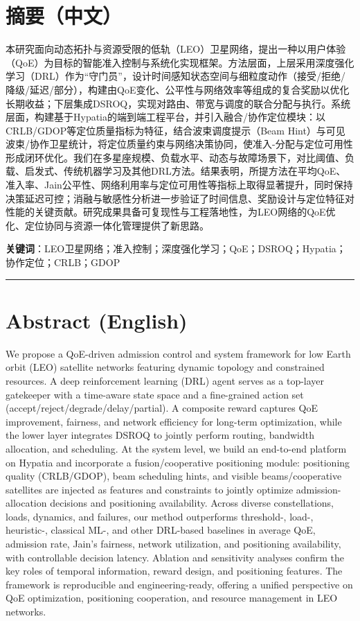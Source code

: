 \section{摘要（中文）}\label{ux6458ux8981ux4e2dux6587}

本研究面向动态拓扑与资源受限的低轨（LEO）卫星网络，提出一种以用户体验（QoE）为目标的智能准入控制与系统化实现框架。方法层面，上层采用深度强化学习（DRL）作为``守门员''，设计时间感知状态空间与细粒度动作（接受/拒绝/降级/延迟/部分），构建由QoE变化、公平性与网络效率等组成的复合奖励以优化长期收益；下层集成DSROQ，实现对路由、带宽与调度的联合分配与执行。系统层面，构建基于Hypatia的端到端工程平台，并引入融合/协作定位模块：以CRLB/GDOP等定位质量指标为特征，结合波束调度提示（Beam
Hint）与可见波束/协作卫星统计，将定位质量约束与网络决策协同，使准入-分配与定位可用性形成闭环优化。我们在多星座规模、负载水平、动态与故障场景下，对比阈值、负载、启发式、传统机器学习及其他DRL方法。结果表明，所提方法在平均QoE、准入率、Jain公平性、网络利用率与定位可用性等指标上取得显著提升，同时保持决策延迟可控；消融与敏感性分析进一步验证了时间信息、奖励设计与定位特征对性能的关键贡献。研究成果具备可复现性与工程落地性，为LEO网络的QoE优化、定位协同与资源一体化管理提供了新思路。

\textbf{关键词}：LEO卫星网络；准入控制；深度强化学习；QoE；DSROQ；Hypatia；协作定位；CRLB；GDOP

\begin{center}\rule{0.5\linewidth}{0.5pt}\end{center}

\section{Abstract (English)}\label{abstract-english}

We propose a QoE-driven admission control and system framework for low
Earth orbit (LEO) satellite networks featuring dynamic topology and
constrained resources. A deep reinforcement learning (DRL) agent serves
as a top-layer gatekeeper with a time-aware state space and a
fine-grained action set (accept/reject/degrade/delay/partial). A
composite reward captures QoE improvement, fairness, and network
efficiency for long-term optimization, while the lower layer integrates
DSROQ to jointly perform routing, bandwidth allocation, and scheduling.
At the system level, we build an end-to-end platform on Hypatia and
incorporate a fusion/cooperative positioning module: positioning quality
(CRLB/GDOP), beam scheduling hints, and visible beams/cooperative
satellites are injected as features and constraints to jointly optimize
admission-allocation decisions and positioning availability. Across
diverse constellations, loads, dynamics, and failures, our method
outperforms threshold-, load-, heuristic-, classical ML-, and other
DRL-based baselines in average QoE, admission rate, Jain's fairness,
network utilization, and positioning availability, with controllable
decision latency. Ablation and sensitivity analyses confirm the key
roles of temporal information, reward design, and positioning features.
The framework is reproducible and engineering-ready, offering a unified
perspective on QoE optimization, positioning cooperation, and resource
management in LEO networks.


